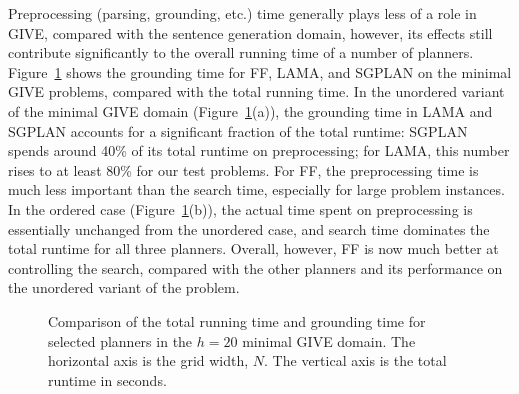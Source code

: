 Preprocessing (parsing, grounding, etc.) time generally plays less of a role in
GIVE, compared with the sentence generation domain, however, its effects still
contribute significantly to the overall running time of a number of planners.
Figure~\ref{fig:give-minimal-grounding} shows the grounding time for FF, LAMA,
and SGPLAN on the minimal GIVE problems, compared with the total running time.
In the unordered variant of the minimal GIVE domain
(Figure~\ref{fig:give-minimal-grounding}(a)), the grounding time in LAMA and
SGPLAN accounts for a significant fraction of the total runtime: SGPLAN spends
around 40\% of its total runtime on preprocessing; for LAMA, this number
rises to at least 80\% for our test problems. For FF, the preprocessing time is
much less important than the search time, especially for large problem
instances. In the ordered case (Figure~\ref{fig:give-minimal-grounding}(b)), the
actual time spent on preprocessing is essentially unchanged from the unordered
case, and search time dominates the total runtime for all three planners.
Overall, however, FF is now much better at controlling the search, compared with
the other planners and its performance on the unordered variant of the problem.


\begin{figure}[t]
  \caption{Comparison of the total running time and grounding time for selected
  planners in the $h=20$ minimal GIVE domain. The horizontal axis is the grid
  width, $N$. The vertical axis is the total runtime in seconds.}
  \label{fig:give-minimal-grounding}
\end{figure}



